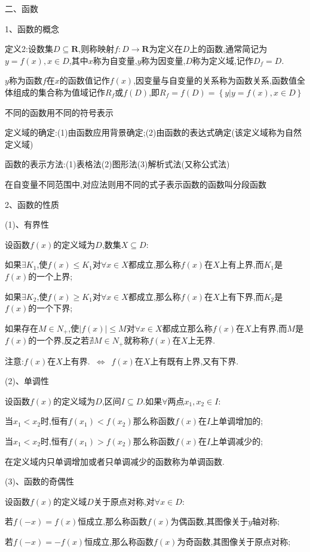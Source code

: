 \documentclass[UTF8]{ctexart}
\begin{document}
二、函数

1、函数的概念

定义2:设数集$D\subseteq  \mathbf{R} $,则称映射$f:D\to  \mathbf{R} $为定义在$D$上的函数,通常简记为$y=f(x),x\in D$,其中$x$称为自变量,$y$称为因变量,$D$称为定义域,记作$D_f=D$.

$y$称为函数$f$在$x$的函数值记作$f(x)$,因变量与自变量的关系称为函数关系,函数值全体组成的集合称为值域记作$R_f$或$f(D)$,即$R_f=f(D)=\left\{  y|y=f(x),x\in D \right\}$

不同的函数用不同的符号表示

定义域的确定:(1)由函数应用背景确定;(2)由函数的表达式确定(该定义域称为自然定义域)

函数的表示方法:(1)表格法(2)图形法(3)解析式法(又称公式法)

在自变量不同范围中,对应法则用不同的式子表示函数的函数叫分段函数

2、函数的性质

(1)、有界性

设函数$f(x)$的定义域为$D$,数集$X\subseteq D$:

如果$\exists K_{1}$,使$f(x)\leqslant K_{1}$对$\forall x\in X$都成立,那么称$f(x)$在$X$上有上界,而$K_{1}$是$f(x)$的一个上界;

如果$\exists K_{2}$,使$f(x)\geqslant  K_{1}$对$\forall x\in X$都成立,那么称$f(x)$在$X$上有下界,而$K_{2}$是$f(x)$的一个下界;

如果存在$M\in N_{+}$,使$|f(x)|\leqslant M$对$\forall x\in X$都成立那么称$f(x)$在$X$上有界,而$M$是$f(x)$的一个界,反之若$\nexists M\in N_{+}$就称称$f(x)$在$X$上无界.

注意:$f(x)$在$X$上有界.\ $\Longleftrightarrow $\ $f(x)$在$X$上有既有上界,又有下界.

(2)、单调性

设函数$f(x)$的定义域为$D$,区间$I\subseteq D$.如果$\forall $两点$x_{1},x_{2}\in I$:

当$x_{1}<x_{2}$时,恒有$f(x_{1})<f(x_{2})$那么称函数$f(x)$在$I$上单调增加的;

当$x_{1}<x_{2}$时,恒有$f(x_{1})>f(x_{2})$那么称函数$f(x)$在$I$上单调减少的;

在定义域内只单调增加或者只单调减少的函数称为单调函数.

(3)、函数的奇偶性

设函数$f(x)$的定义域$D$关于原点对称,对$\forall x\in D$:

若$f(-x)=f(x)$恒成立,那么称函数$f(x)$为偶函数,其图像关于$y$轴对称;

若$f(-x)=-f(x)$恒成立,那么称函数$f(x)$为奇函数,其图像关于原点对称;
\end{document}
